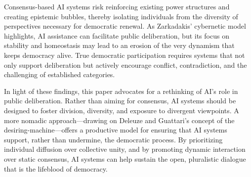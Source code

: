 Consensus-based AI systems risk reinforcing existing power structures and creating epistemic bubbles, thereby isolating individuals from the diversity of perspectives necessary for democratic renewal. As Zarkadakis’ cybernetic model highlights, AI assistance can facilitate public deliberation, but its focus on stability and homeostasis may lead to an erosion of the very dynamism that keeps democracy alive. True democratic participation requires systems that not only support deliberation but actively encourage conflict, contradiction, and the challenging of established categories.

In light of these findings, this paper advocates for a rethinking of AI's role in public deliberation. Rather than aiming for consensus, AI systems should be designed to foster division, diversity, and exposure to divergent viewpoints. A more nomadic approach—drawing on Deleuze and Guattari’s concept of the desiring-machine—offers a productive model for ensuring that AI systems support, rather than undermine, the democratic process. By prioritizing individual diffusion over collective unity, and by promoting dynamic interaction over static consensus, AI systems can help sustain the open, pluralistic dialogue that is the lifeblood of democracy.


\printbibliography

